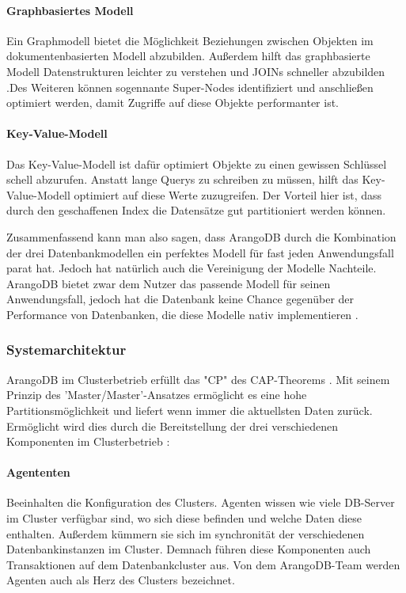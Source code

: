 \paragraph{Graphbasiertes Modell} Ein Graphmodell bietet die Möglichkeit Beziehungen zwischen Objekten im dokumentenbasierten Modell abzubilden. Außerdem hilft das graphbasierte Modell Datenstrukturen leichter zu verstehen und JOINs schneller abzubilden \cite{AWS_graph}.Des Weiteren können sogennante Super-Nodes identifiziert und anschließen optimiert werden, damit Zugriffe auf diese Objekte performanter ist.
\paragraph{Key-Value-Modell} Das Key-Value-Modell ist dafür optimiert Objekte zu einen gewissen Schlüssel schell abzurufen. Anstatt lange Querys zu schreiben zu müssen, hilft das Key-Value-Modell optimiert auf diese Werte zuzugreifen. Der Vorteil hier ist, dass durch den geschaffenen Index die Datensätze gut partitioniert werden können. \cite{AWS_keyvalue}

Zusammenfassend kann man also sagen, dass ArangoDB durch die Kombination der drei Datenbankmodellen ein perfektes Modell für fast jeden Anwendungsfall parat hat. Jedoch hat natürlich auch die Vereinigung der Modelle Nachteile. ArangoDB bietet zwar dem Nutzer das passende Modell für seinen Anwendungsfall, jedoch hat die Datenbank keine Chance gegenüber der Performance von Datenbanken, die diese Modelle nativ implementieren \cite{ADB_benchmark}.
\subsubsection{Systemarchitektur}
ArangoDB im Clusterbetrieb erfüllt das "CP" des CAP-Theorems \cite{CAP}. Mit seinem Prinzip des 'Master/Master'-Ansatzes ermöglicht es eine hohe Partitionsmöglichkeit und liefert wenn immer die aktuellsten Daten zurück. Ermöglicht wird dies durch die Bereitstellung der drei verschiedenen Komponenten im Clusterbetrieb \cite{ADB_clusterarch}:
\paragraph{Agententen} 
Beeinhalten die Konfiguration des Clusters. Agenten wissen wie viele DB-Server im Cluster verfügbar sind, wo sich diese befinden und welche Daten diese enthalten. Außerdem kümmern sie sich im synchronität der verschiedenen Datenbankinstanzen im Cluster. Demnach führen diese Komponenten auch Transaktionen auf dem Datenbankcluster aus. Von dem ArangoDB-Team werden Agenten auch als Herz des Clusters bezeichnet. \cite{ADB_clusterarch}

